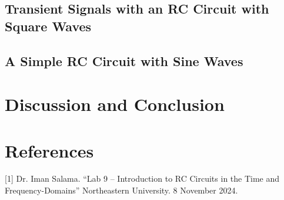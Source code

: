\documentclass[12pt]{article}
\begin{document}
\subsection{Transient Signals with an RC Circuit with Square Waves}


\subsection{A Simple RC Circuit with Sine Waves}

\section{Discussion and Conclusion}
\section{References}
 [1] Dr. Iman Salama. “Lab 9 – Introduction to RC Circuits in the Time and Frequency-Domains” Northeastern University. 8 November 2024.
\end{document}
